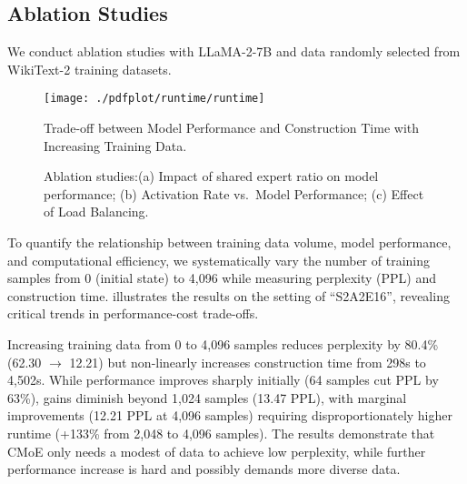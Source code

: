 \subsection{Ablation Studies}
We conduct ablation studies with LLaMA-2-7B and data randomly selected from WikiText-2 training datasets.

\begin{figure}[tb!]
    \centering
    \texttt{[image: ./pdfplot/runtime/runtime]}\vspace{-2mm} 
    \caption{Trade-off between Model Performance and Construction Time with Increasing Training Data.
    }
    \label{fig:ab_1}
\end{figure}



\begin{figure*}[t!]
    \centering
    \caption{
        Ablation studies:(a) Impact of shared expert ratio on model performance;
        (b) Activation Rate vs.~Model Performance;
        (c) Effect of Load Balancing.
    }
    \label{fig:ablation_all} 
\end{figure*}


To quantify the relationship between training data volume, model performance, and computational efficiency, we systematically vary the number of training samples from 0 (initial state) to 4,096 while measuring perplexity (PPL) and construction time. 
 illustrates the results on the setting of ``S2A2E16'', revealing critical trends in performance-cost trade-offs.

Increasing training data from 0 to 4,096 samples reduces perplexity by 80.4\% (62.30 $\to$ 12.21) but non-linearly increases construction time from 298s to 4,502s. 
While performance improves sharply initially (64 samples cut PPL by 63\%), gains diminish beyond 1,024 samples (13.47 PPL), with marginal improvements (12.21 PPL at 4,096 samples) requiring disproportionately higher runtime (+133\% from 2,048 to 4,096 samples). 
The results demonstrate that CMoE only needs a modest of data to achieve low perplexity, while further performance increase is hard and possibly demands more diverse data.



